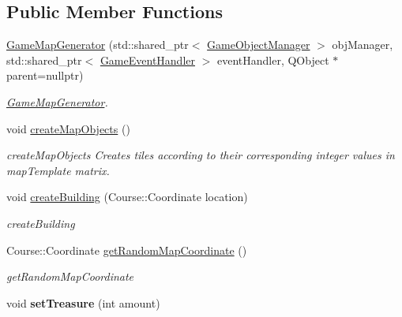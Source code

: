 \subsection*{Public Member Functions}
\begin{DoxyCompactItemize}
\item 
\hyperlink{class_game_1_1_game_map_generator_aa8954c522853a78bc313de335c09a584}{Game\-Map\-Generator} (std\-::shared\-\_\-ptr$<$ \hyperlink{class_game_1_1_game_object_manager}{Game\-Object\-Manager} $>$ obj\-Manager, std\-::shared\-\_\-ptr$<$ \hyperlink{class_game_1_1_game_event_handler}{Game\-Event\-Handler} $>$ event\-Handler, Q\-Object $\ast$parent=nullptr)
\begin{DoxyCompactList}\small\item\em \hyperlink{class_game_1_1_game_map_generator}{Game\-Map\-Generator}. \end{DoxyCompactList}\item 
\hypertarget{class_game_1_1_game_map_generator_a074eff0c7eccb9f9d0fc356d0f08ed3b}{void \hyperlink{class_game_1_1_game_map_generator_a074eff0c7eccb9f9d0fc356d0f08ed3b}{create\-Map\-Objects} ()}\label{class_game_1_1_game_map_generator_a074eff0c7eccb9f9d0fc356d0f08ed3b}

\begin{DoxyCompactList}\small\item\em create\-Map\-Objects Creates tiles according to their corresponding integer values in map\-Template matrix. \end{DoxyCompactList}\item 
void \hyperlink{class_game_1_1_game_map_generator_afad5aeb1e5bcfba092f215875738151d}{create\-Building} (Course\-::\-Coordinate location)
\begin{DoxyCompactList}\small\item\em create\-Building \end{DoxyCompactList}\item 
Course\-::\-Coordinate \hyperlink{class_game_1_1_game_map_generator_ac8afc913679cc83e1e9fdb0fe2ddacbd}{get\-Random\-Map\-Coordinate} ()
\begin{DoxyCompactList}\small\item\em get\-Random\-Map\-Coordinate \end{DoxyCompactList}\item 
\hypertarget{class_game_1_1_game_map_generator_ab39d179c38d46d2289822aff823f0ad9}{void {\bfseries set\-Treasure} (int amount)}\label{class_game_1_1_game_map_generator_ab39d179c38d46d2289822aff823f0ad9}


\end{DoxyCompactItemize}
